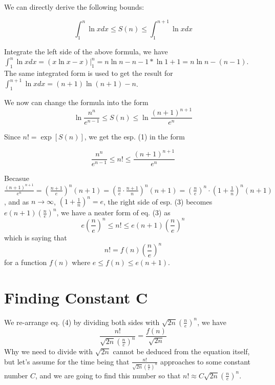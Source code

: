 \documentclass[11pt]{article}
\begin{document}
We can directly derive the following bounds:

\begin{equation}
 \int^{n}_{1} \ln x dx \leqslant  S(n) \leqslant \int ^{n+1} _ {1} \ln x dx
\end{equation}


Integrate the left side of the above formula,  we have $ \displaystyle  \int ^n _1 \ln x dx = (x \ln x - x) \bigg \rvert ^n _1 = n \ln n -n - 1* \ln 1 + 1 = n \ln n - (n - 1) $.  The same integrated form is used to get the result for $ \displaystyle \int ^{n+1} _ {1} \ln x dx =  (n+1) \ln (n+1) - n $.  

We now can change the formula into the form
\begin{equation}
 \ln \frac {n^n}{e^{n-1}} \leqslant S(n) \leqslant \ln \frac{(n+1)^{n+1}}{e^n}
\end{equation}

Since $n! = \exp [S(n)]$,  we get the esp. (1) in the form

\begin{equation}
\frac {n^n}{e^{n-1}} \leqslant n! \leqslant  \frac{(n+1)^{n+1}}{e^n}
\end{equation} 

Becasue $\displaystyle \frac{(n+1)^{n+1}}{e^n} = \left( \frac{n+1}{e} \right) ^n  (n+1) = \left( \frac{n}{e} \cdot \frac{n+1}{n} \right) ^n (n+1) = \left( \frac{n}{e} \right) ^n \cdot \left( 1 + \frac{1}{n} \right) ^n (n+1) $,  and as $n \to \infty$,  $\displaystyle \left( 1 + \frac{1}{n} \right) ^n = e$,  the right side of esp. (3) becomes $ \displaystyle e(n+1) \left( \frac{n}{e} \right) ^n$,  we have a neater form of eq. (3) as
$$ e \left( \frac{n}{e} \right) ^n \leqslant n! \leqslant e(n+1) \left( \frac{n}{e} \right) ^n $$
which is saying that 
\begin{equation}
n! = f(n) \left( \frac{n}{e} \right) ^n
\end{equation}
for a function $f(n)$ where $ e \leqslant f(n) \leqslant e(n+1) $.


\section {\large Finding Constant C}

We re-arrange eq. (4) by dividing both sides with $ \displaystyle \sqrt{2n} \left( \frac{n}{e} \right) ^n $,  we have 
$$ \displaystyle  \frac {n!}  { \sqrt{2n}  \left( \frac{n}{e} \right) ^n } = \frac {f(n)} { \sqrt{2n} } $$
Why we need to divide with $ \sqrt {2n}$ cannot be deduced from the equation itself,  but let's assume for the time being that $ \displaystyle  \frac {n!}  { \sqrt{2n}  \left( \frac{n}{e} \right) ^n } $ approaches to some constant number $C$,  and we are going to find this number so that $\displaystyle n! \approx C  \sqrt{2n}  \left( \frac{n}{e} \right) ^n $.
\end{document}
